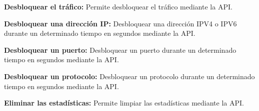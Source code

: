 \begin{functional}
        \item \textbf{Desbloquear el tráfico:} Permite desbloquear el tráfico mediante la API.
        \begin{functional}
            \item \textbf{Desbloquear una dirección IP:} Desbloquear una dirección IPV4 o IPV6 durante un determinado tiempo en segundos mediante la API.
            \item \textbf{Desbloquear un puerto:} Desbloquear un puerto durante un determinado tiempo en segundos mediante la API.
            \item \textbf{Desbloquear un protocolo:} Desbloquear un protocolo durante un determinado tiempo en segundos mediante la API.
        \end{functional}
        
        
        \item \textbf{Eliminar las estadísticas:} Permite limpiar las estadísticas mediante la API.
   
        
\end{functional}


